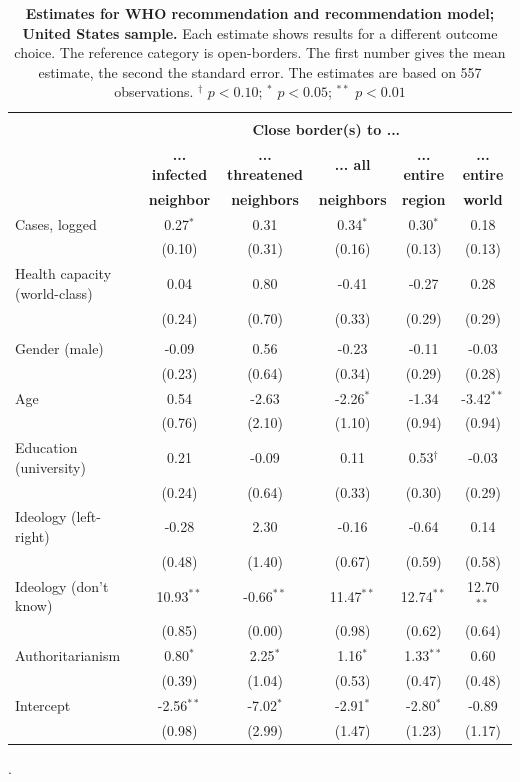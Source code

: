 \begin{table}[ht!]
\begin{center}
\footnotesize
\renewcommand{\arraystretch}{1.05}
\begin{tabular}{@{\extracolsep{4.8pt}}lccccc} 
\\[-1.8ex]\hline \\[-1.8ex]
 & \multicolumn{5}{c}{\normalsize{\textbf{Close border(s) to ...}}}
\\
  & \small{\textbf{... infected}} & \small{\textbf{... threatened}} & \small{\textbf{... all}} & \small{\textbf{... entire }} & \small{\textbf{... entire}}
 \\
  & \small{\textbf{neighbor}} & \small{\textbf{neighbors}} & \small{\textbf{neighbors}} & \small{\textbf{region}} & \small{\textbf{world}}
 \\
\hline
Cases, logged & 0.27$^{*}$ & 0.31 & 0.34$^{*}$ & 0.30$^{*}$ & 0.18\\
 & (0.10) & (0.31) & (0.16) & (0.13) & (0.13)\\
Health capacity (world-class) & 0.04 & 0.80 & -0.41 & -0.27 & 0.28\\
 & (0.24) & (0.70) & (0.33) & (0.29) & (0.29)\\
\\
Gender (male) & -0.09 & 0.56 & -0.23 & -0.11 & -0.03\\
 & (0.23) & (0.64) & (0.34) & (0.29) & (0.28)\\
Age & 0.54 & -2.63 & -2.26$^{*}$ & -1.34 & -3.42$^{**}$\\
 & (0.76) & (2.10) & (1.10) & (0.94) & (0.94)\\
Education (university) & 0.21 & -0.09 & 0.11 & 0.53$^{\dag}$ & -0.03\\
 & (0.24) & (0.64) & (0.33) & (0.30) & (0.29)\\
Ideology (left-right) & -0.28 & 2.30 & -0.16 & -0.64 & 0.14\\
 & (0.48) & (1.40) & (0.67) & (0.59) & (0.58)\\
Ideology (don't know) & 10.93$^{**}$ & -0.66$^{**}$ & 11.47$^{**}$ & 12.74$^{**}$ & 12.70$^{**}$\\
 & (0.85) & (0.00) & (0.98) & (0.62) & (0.64)\\
Authoritarianism & 0.80$^{*}$ & 2.25$^{*}$ & 1.16$^{*}$ & 1.33$^{**}$ & 0.60\\
 & (0.39) & (1.04) & (0.53) & (0.47) & (0.48)\\
Intercept & -2.56$^{**}$ & -7.02$^{*}$ & -2.91$^{*}$ & -2.80$^{*}$ & -0.89\\
 & (0.98) & (2.99) & (1.47) & (1.23) & (1.17)\\
\hline
\hline
\end{tabular}
\caption{\textbf{Estimates for WHO recommendation and recommendation model; United States sample.} Each estimate shows results for a different outcome choice. The reference category is open-borders. The first number gives the mean estimate, 
                the second the standard error. The estimates are based on 557 observations. $^{\dag}$ $p < 0.10$; $^{*}$ $p < 0.05$; $^{**}$ $p < 0.01$}.
\label{Tab:MainUS_4}
\end{center}
\end{table}
